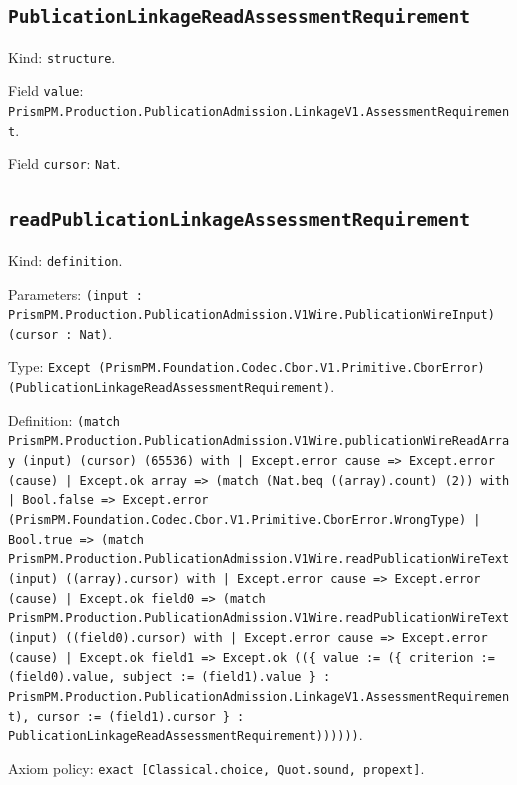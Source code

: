 \documentclass[11pt]{article}
\begin{document}
\subsection*{\texttt{PublicationLinkageReadAssessmentRequirement}}
\noindent Kind: \texttt{structure}.\par
\noindent Field \texttt{value}: \texttt{PrismPM.Production.PublicationAdmission.LinkageV1.AssessmentRequirement}.\par
\noindent Field \texttt{cursor}: \texttt{Nat}.\par
\subsection*{\texttt{readPublicationLinkageAssessmentRequirement}}
\noindent Kind: \texttt{definition}.\par
\noindent Parameters: \texttt{(input : PrismPM.Production.PublicationAdmission.V1Wire.PublicationWireInput) (cursor : Nat)}.\par
\noindent Type: \texttt{Except (PrismPM.Foundation.Codec.Cbor.V1.Primitive.CborError) (PublicationLinkageReadAssessmentRequirement)}.\par
\noindent Definition: \texttt{(match PrismPM.Production.PublicationAdmission.V1Wire.publicationWireReadArray (input) (cursor) (65536) with | Except.error cause => Except.error (cause) | Except.ok array => (match (Nat.beq ((array).count) (2)) with | Bool.false => Except.error (PrismPM.Foundation.Codec.Cbor.V1.Primitive.CborError.WrongType) | Bool.true => (match PrismPM.Production.PublicationAdmission.V1Wire.readPublicationWireText (input) ((array).cursor) with | Except.error cause => Except.error (cause) | Except.ok field0 => (match PrismPM.Production.PublicationAdmission.V1Wire.readPublicationWireText (input) ((field0).cursor) with | Except.error cause => Except.error (cause) | Except.ok field1 => Except.ok ((\{ value := (\{ criterion := (field0).value, subject := (field1).value \} : PrismPM.Production.PublicationAdmission.LinkageV1.AssessmentRequirement), cursor := (field1).cursor \} : PublicationLinkageReadAssessmentRequirement))))))}.\par
\noindent Axiom policy: \texttt{exact [Classical.choice, Quot.sound, propext]}.\par
\end{document}
